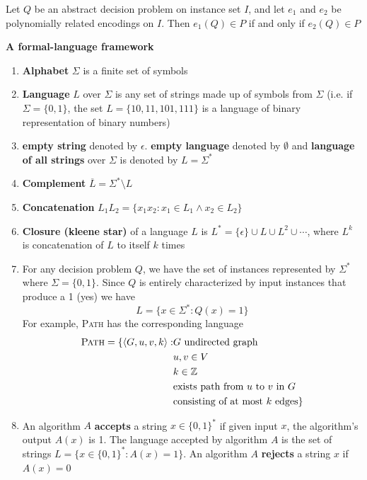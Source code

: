 \documentclass[11pt]{article}
\begin{document}
\begin{lemma*}
    Let $Q$ be an abstract decision problem on instance set $I$, and let $e_1$ and $e_2$ be polynomially related encodings on $I$. Then $e_1(Q) \in P$ if and only if $e_2(Q) \in P$
\end{lemma*}


\begin{defn*}
    \textbf{A formal-language framework} 
    \begin{enumerate}
        \item \textbf{Alphabet} $\Sigma$ is a finite set of symbols 
        \item \textbf{Language} $L$ over $\Sigma$ is any set of strings made up of symbols from $\Sigma$ (i.e. if $\Sigma = \{0,1\}$, the set $L = \{ 10, 11, 101, 111\}$ is a language of binary representation of binary numbers) 
        \item \textbf{empty string} denoted by $\epsilon$. \textbf{empty language} denoted by $\emptyset$ and \textbf{language of all strings} over $\Sigma$ is denoted by $L = \Sigma^*$
        \item \textbf{Complement} $\overline{L} = \Sigma^* \setminus L$
        \item \textbf{Concatenation} $L_1 L_2 = \{ x_1 x_2 : x_1\in L_1 \land x_2\in L_2\}$
        \item \textbf{Closure (kleene star)} of a language $L$ is $L^* = \{ \epsilon\} \cup L \cup L^2 \cup \cdots$, where $L^k$ is concatenation of $L$ to itself $k$ times
        \item For any decision problem $Q$, we have the set of instances represented by $\Sigma^*$ where $\Sigma = \{0, 1\}$. Since $Q$ is entirely characterized by input instances that produce a 1 (yes) we have 
        \[
            L = \{ x \in \Sigma^* : Q(x) = 1 \}
        \]
        For example, \textsc{Path} has the corresponding language 
        \begin{align*}
             \textsc{Path} = \{ \langle G, u, v, k\rangle: 
                &G \text{ undirected graph}\\
                &u,v\in V\\
                &k \in \mathbb{Z}\\
                &\text{exists path from $u$ to $v$ in $G$} \\
                &\text{consisting of at most $k$ edges} \} \\ 
        \end{align*}
        \item An algorithm $A$ \textbf{accepts} a string $x\in \{0,1\}^*$ if given input $x$, the algorithm's output $A(x)$ is 1. The language accepted by algorithm $A$ is the set of strings $L = \{x\in\{0,1 \}^*: A(x)=1 \}$. An algorithm $A$ \textbf{rejects} a string $x$ if $A(x) = 0$

\end{enumerate}
\end{defn*}
\end{document}
